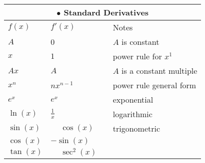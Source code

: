 \newline\phantom{blank line here please}\\
{\hspace*{0.55cm}	
	\renewcommand{\arraystretch}{1.2}
		\begin{tabular}{llll}
			\multicolumn{4}{c}{$\bullet$ Standard Derivatives}\\\midrule
			$f(x)$ & $f'(x)$  &&Notes\\ \midrule
			$A$&0&&$A$ is constant\\ 
			$x$&$1$&&power rule for $x^1$\\ 
			$Ax$&$A$&&$A$ is a constant multiple\\ \midrule
			$x^n$ & $nx^{n-1}$ &&power rule general form\\ 
			$e^x$ & $e^x$  && exponential\\ 
			$\ln(x)$ & $\frac{1}{x}$ &&logarithmic\\ \midrule
			$\sin(x)$ & $\phantom{-}\cos(x)$  &&trigonometric \\ 
			$\cos(x)$ & $-\sin(x)$ && \\ 
			$\tan(x)$ & $\phantom{-}\sec^2(x)$ && \\ \bottomrule
		\end{tabular}
}
